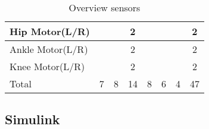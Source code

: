 \begin{table}[]
\begin{tabular}{|l|c|c|c|c|c|c|c|}
		Hip Motor(L/R)        &                          &                                       & 2                                   &                                      &                                    &                                          & 2                          \\ \hline
		Ankle Motor(L/R)      &                          &                                       & 2                                   &                                      &                                    &                                          & 2                          \\ \hline
		Knee Motor(L/R)       &                          &                                       & 2                                   &                                      &                                    &                                          & 2                          \\ \hline
		Total                 & 7                        & 8                                     & 14                                  & 8                                    & 6                                  & 4                                        & 47                         \\ \hline
	\end{tabular}
	\caption{Overview sensors}
	\label{my-label}
\end{table}

\subsection{Simulink}



